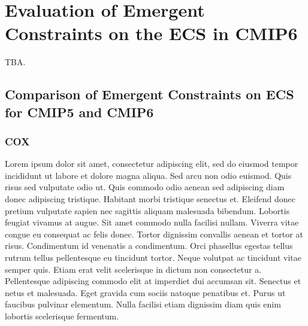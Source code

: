 


\chapter{Evaluation of Emergent Constraints on the \acl{ECS} in \acs{CMIP}6}
\label{ch:05:paper_ecs}

TBA.


\section{Comparison of Emergent Constraints on \acs{ECS} for \acs{CMIP}5 and \acs{CMIP}6}
\label{sec:05:comparison_of_emergent_constraints}


\subsection{COX}
\label{subsec:05:cox}

Lorem ipsum dolor sit amet, consectetur adipiscing elit, sed do eiusmod tempor
incididunt ut labore et dolore magna aliqua. Sed arcu non odio euismod. Quis
risus sed vulputate odio ut. Quis commodo odio aenean sed adipiscing diam donec
adipiscing tristique. Habitant morbi tristique senectus et. Eleifend donec
pretium vulputate sapien nec sagittis aliquam malesuada bibendum. Lobortis
feugiat vivamus at augue. Sit amet commodo nulla facilisi nullam. Viverra vitae
congue eu consequat ac felis donec. Tortor dignissim convallis aenean et tortor
at risus. Condimentum id venenatis a condimentum. Orci phasellus egestas tellus
rutrum tellus pellentesque eu tincidunt tortor. Neque volutpat ac tincidunt
vitae semper quis. Etiam erat velit scelerisque in dictum non consectetur a.
Pellentesque adipiscing commodo elit at imperdiet dui accumsan sit. Senectus et
netus et malesuada. Eget gravida cum sociis natoque penatibus et. Purus ut
faucibus pulvinar elementum. Nulla facilisi etiam dignissim diam quis enim
lobortis scelerisque fermentum.

